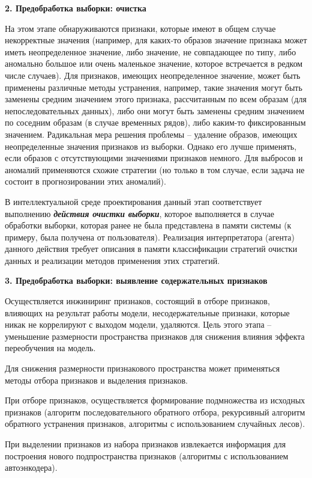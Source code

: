 \textbf{2. Предобработка выборки: очистка}

На этом этапе обнаруживаются признаки, которые имеют в общем случае некорректные значения (например, для каких-то образов значение признака может иметь неопределенное значение, либо значение, не совпадающее по типу, либо аномально большое или очень маленькое значение, которое встречается в редком числе случаев). Для признаков, имеющих неопределенное значение, может быть применены различные методы устранения, например, такие значения могут быть заменены средним значением этого признака, рассчитанным по всем образам (для непоследовательных данных), либо они могут быть заменены средним значением по соседним образам (в случае временных рядов), либо каким-то фиксированным значением. Радикальная мера решения проблемы -- удаление образов, имеющих неопределенные значения признаков из выборки. Однако его лучше применять, если образов с отсутствующими значениями признаков немного. Для выбросов и аномалий применяются схожие стратегии (но только в том случае, если задача не состоит в прогнозировании этих аномалий).

В интеллектуальной среде проектирования данный этап соответствует выполнению \textbf{\textit{действия очистки выборки}}, которое выполняется в случае обработки выборки, которая ранее не была представлена в памяти системы (к примеру, была получена от пользователя).
Реализация интерпретатора (агента) данного действия требует описания в памяти классификации стратегий очистки данных и реализации методов применения этих стратегий.


\textbf{3. Предобработка выборки: выявление содержательных признаков}

Осуществляется инжиниринг признаков, состоящий в отборе признаков, влияющих на результат работы модели, несодержательные признаки, которые никак не коррелируют с выходом модели, удаляются. Цель этого этапа -- уменьшение размерности пространства признаков для снижения влияния эффекта переобучения на модель.

Для снижения размерности признакового пространства может применяться методы отбора признаков и выделения признаков.

При отборе признаков, осуществляется формирование подмножества из исходных признаков (алгоритм последовательного обратного отбора, рекурсивный алгоритм обратного устранения признаков,  алгоритмы с использованием случайных лесов).

При выделении признаков из набора признаков извлекается информация для построения нового подпространства признаков (алгоритмы с использованием автоэнкодера).

